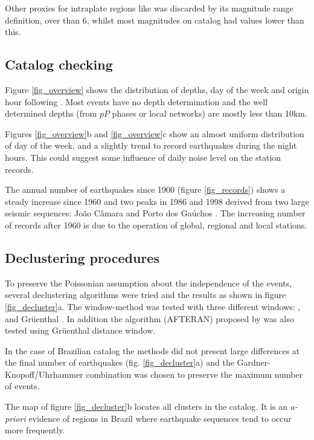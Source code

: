 \documentclass[draft, grl]{agutex}
\begin{document}
\begin{article}
Other proxies for intraplate regions like \citet{scordilis_2006} was discarded by its magnitude range definition, over than 6, whilst most magnitudes on \citet{bsb_2014} catalog had values lower than this.


\subsection{Catalog checking}

Figure \ref{fig_overview} shows the distribution of depths, day of the week and origin hour following \citet{gulia_2012}. Most events have no depth determination and the well determined depths (from $pP$ phases or local networks) are mostly less than 10km.

Figures \ref{fig_overview}b and \ref{fig_overview}c show an almost uniform distribution of day of the week, and a slightly trend to record earthquakes during the night hours. This could suggest some influence of daily noise level on the station records.

The annual number of earthquakes since 1900 (figure \ref{fig_records}) shows a steady increase since 1960 and two peaks in 1986 and 1998 derived from two large seismic sequences: João Câmara \citep{takeya_1989} and Porto dos Gaúchos \citep{barros_2009}. The increasing number of records after 1960 is due to the operation of global, regional and local stations.



\subsection{Declustering procedures}

To preserve the Poissonian assumption about the independence of the events, several declustering algorithms were tried and the results as shown in figure \ref{fig_decluster}a. The window-method \citep{gardner_1974} was tested with three different windows: \citet{gardner_1974}, \citet{uhrhammer_1986} and Gr\"uenthal \citep{van_stiphout_2012}.
In addition the algorithm (AFTERAN) proposed by \citet{musson_1999} was also tested using Gr\"uenthal distance window.

In the case of Brazilian catalog the methods did not present large differences at the final number of earthquakes (fig. \ref{fig_decluster}a) and the Gardner-Knopoff/Uhrhammer combination was chosen to preserve the maximum number of events.

The map of figure \ref{fig_decluster}b locates all clusters in the catalog. It is an \emph{a-priori} evidence of regions in Brazil where  earthquake sequences tend to occur more frequently.



\end{article}
\end{document}
